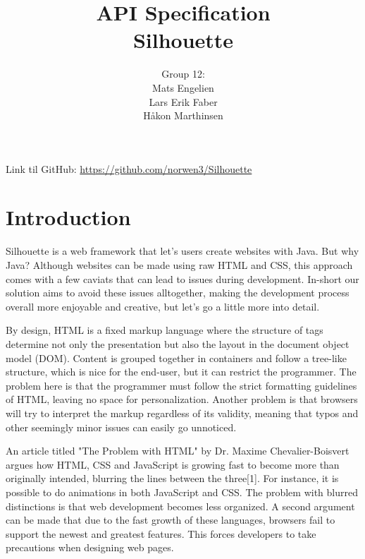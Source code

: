\documentclass[12pt]{article}
\begin{document}
\title{%
    API Specification\\
    \large Silhouette}
\author{%
    Group 12:\\
    Mats Engelien\\
    Lars Erik Faber\\
    Håkon Marthinsen}
\date{}
\maketitle

\thispagestyle{empty}

\newpage

\tableofcontents

\thispagestyle{empty}

\newpage

\setcounter{page}{1}

Link til GitHub: \href{https://github.com/norwen3/Silhouette}{https://github.com/norwen3/Silhouette}

\section{Introduction}

Silhouette is a web framework that let's users create websites with Java. But why Java? Although websites can be made using raw HTML and CSS, this approach comes with a few caviats that can lead to issues during development. In-short our solution aims to avoid these issues alltogether, making the development process overall more enjoyable and creative, but let's go a little more into detail.

By design, HTML is a fixed markup language where the structure of tags determine not only the presentation but also the layout in the document object model (DOM). Content is grouped together in containers and follow a tree-like structure, which is nice for the end-user, but it can restrict the programmer. The problem here is that the programmer must follow the strict formatting guidelines of HTML, leaving no space for personalization. Another problem is that browsers will try to interpret the markup regardless of its validity, meaning that typos and other seemingly minor issues can easily go unnoticed.

An article titled "The Problem with HTML" by Dr. Maxime Chevalier-Boisvert argues how HTML, CSS and JavaScript is growing fast to become more than originally intended, blurring the lines between the three[1]. For instance, it is possible to do animations in both JavaScript and CSS. The problem with blurred distinctions is that web development becomes less organized. A second argument can be made that due to the fast growth of these languages, browsers fail to support the newest and greatest features. This forces developers to take precautions when designing web pages.
\end{document}
